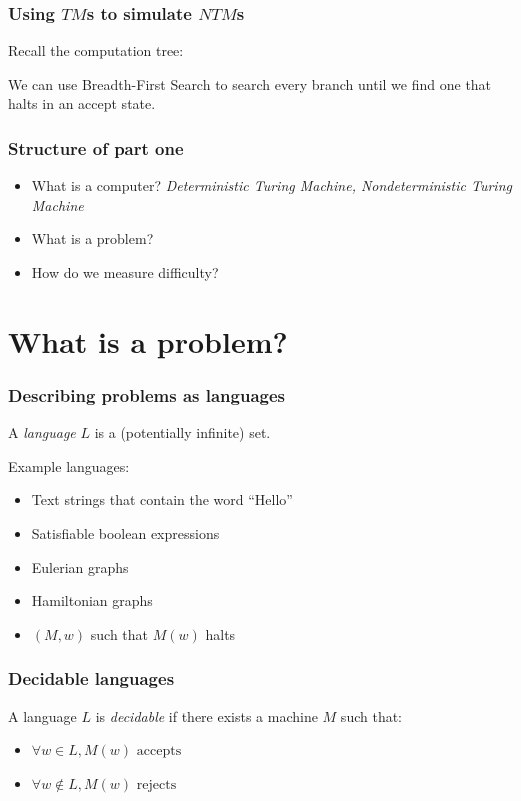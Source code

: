 \documentclass[aspectratio=169]{beamer}
\begin{document}
\begin{frame}
\frametitle{Using $TM$s to simulate $NTM$s}
Recall the computation tree:

We can use Breadth-First Search to search every branch until we find one that halts in an accept state.
\end{frame}

\begin{frame}
\frametitle{Structure of part one}
\begin{itemize}
    \item What is a computer? {\em Deterministic Turing Machine, Nondeterministic Turing Machine}
    \item What is a problem?
    \item How do we measure difficulty?
\end{itemize}
\end{frame}

\section{What is a problem?}

\begin{frame}
\frametitle{Describing problems as languages}
A {\em language} $L$ is a (potentially infinite) set.

Example languages:
\begin{itemize}
    \item Text strings that contain the word ``Hello''
    \item Satisfiable boolean expressions
    \item Eulerian graphs
    \item Hamiltonian graphs
    \item $(M, w)$ such that $M(w)$ halts
\end{itemize}
\end{frame}

\begin{frame}
\frametitle{Decidable languages}
A language $L$ is {\em decidable} if there exists a machine $M$ such that:

\begin{itemize}
    \item $\forall w \in L, M(w) \text{ accepts}$
    \item $\forall w \notin L, M(w) \text{ rejects}$
\end{itemize}
\end{frame}
\end{document}
